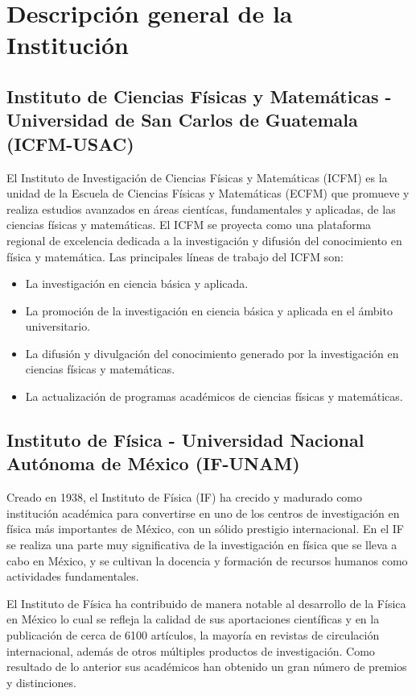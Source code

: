 \documentclass[11pt, spanish, letterpage]{article}
\begin{document}
\section{Descripción general de la Institución}
\subsection{Instituto de Ciencias Físicas y Matemáticas - Universidad de San Carlos de Guatemala (ICFM-USAC)}
El Instituto de Investigación de Ciencias Físicas y Matemáticas (ICFM) es la unidad de la Escuela de Ciencias Físicas y Matemáticas (ECFM) que promueve y realiza estudios avanzados en áreas cientícas, fundamentales y aplicadas, de las ciencias físicas y matemáticas. El ICFM se proyecta como una plataforma regional de excelencia dedicada a la investigación y difusión del conocimiento en física y matemática. Las principales líneas de trabajo del ICFM son:
\begin{itemize}
	\item La investigación en ciencia básica y aplicada.
	\item La promoción de la investigación en ciencia básica y aplicada en el ámbito universitario.
	\item La difusión y divulgación del conocimiento generado por la investigación en ciencias físicas y matemáticas. 
	\item La actualización de programas académicos de ciencias físicas y matemáticas.
\end{itemize}

\subsection{Instituto de Física - Universidad Nacional Autónoma de México (IF-UNAM)}
Creado en 1938, el Instituto de Física (IF) ha crecido y madurado como institución académica para convertirse en uno de los centros de investigación en física más importantes de México, con un sólido prestigio internacional. En el IF se realiza una parte muy significativa de la investigación en física que se lleva a cabo en México, y se cultivan la docencia y formación de recursos humanos como actividades fundamentales.

El Instituto de Física ha contribuido de manera notable al desarrollo de la Física en México lo cual se refleja la calidad de sus aportaciones científicas y en la publicación de cerca de 6100 artículos, la mayoría en revistas de circulación internacional, además de otros múltiples productos de investigación. Como resultado de lo anterior sus académicos han obtenido un gran número de premios y distinciones.
\end{document}
